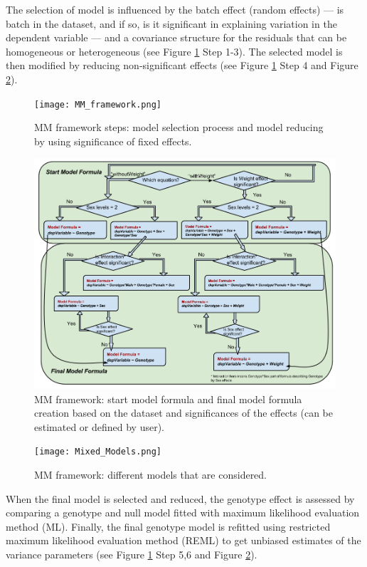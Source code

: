 \documentclass[12pt,a4paper]{article}
\begin{document}
The selection of model is influenced by the batch effect (random effects) --- is batch in the dataset, and if so, is it significant in explaining variation in the dependent variable --- and a covariance structure for the residuals that can be homogeneous or heterogeneous (see Figure \ref{fig:02} Step 1-3).
The selected model is then modified by reducing non-significant effects (see Figure \ref{fig:02} Step 4 and Figure \ref{fig:03}).

\begin{figure}[!tpb]%
\centerline{\texttt{[image: MM\_framework.png]}}
\caption{MM framework steps: model selection process and model reducing by using significance of fixed effects.}\label{fig:02}
\end{figure}

\begin{figure}[!tpb]%
\centerline{\includegraphics[scale=0.5]{Model_Formula.png}}
\caption{MM framework: start model formula and final model formula creation based on the dataset and significances of the effects (can be estimated or defined by user). }\label{fig:03}
\end{figure}

\begin{figure}[!tpb]%
\centerline{\texttt{[image: Mixed\_Models.png]}}
\caption{MM framework: different models that are considered. }\label{fig:04}
\end{figure}

When the final model is selected and reduced, the genotype effect is assessed by comparing a genotype and null model fitted with maximum likelihood evaluation method (ML). Finally, the final genotype model is refitted using restricted maximum likelihood evaluation method (REML) to get unbiased estimates of the variance parameters (see Figure \ref{fig:02} Step 5,6 and Figure \ref{fig:03}).   
\end{document}
